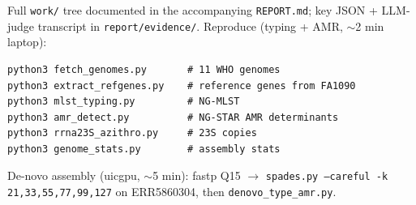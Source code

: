 \documentclass[11pt,letterpaper]{article}
\begin{document}
Full \texttt{work/} tree documented in the accompanying \texttt{REPORT.md}; key JSON + LLM-judge transcript in \texttt{report/evidence/}. Reproduce (typing + AMR, $\sim$2 min laptop):

\begin{verbatim}
python3 fetch_genomes.py       # 11 WHO genomes
python3 extract_refgenes.py    # reference genes from FA1090
python3 mlst_typing.py         # NG-MLST
python3 amr_detect.py          # NG-STAR AMR determinants
python3 rrna23S_azithro.py     # 23S copies
python3 genome_stats.py        # assembly stats
\end{verbatim}

De-novo assembly (uicgpu, $\sim$5 min): fastp Q15 $\rightarrow$ \texttt{spades.py --careful -k 21,33,55,77,99,127} on ERR5860304, then \texttt{denovo\_type\_amr.py}.
\end{document}
